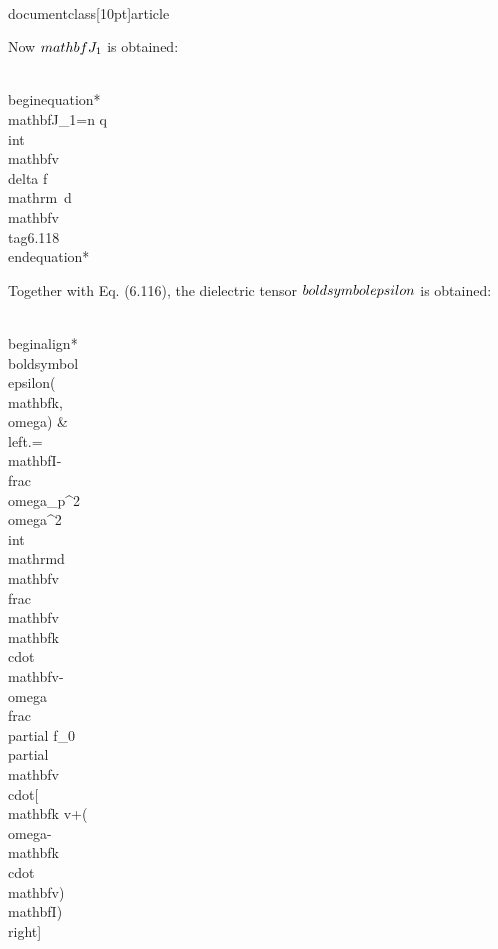 \\documentclass[10pt]{article}
\begin{document}
{{{{Now $\\mathbf{J}_{1}$ is obtained:


\\begin{equation*}
\\mathbf{J}_{1}=n q \\int \\mathbf{v} \\delta f \\mathrm{~d} \\mathbf{v} \\tag{6.118}
\\end{equation*}


Together with Eq. (6.116), the dielectric tensor $\\boldsymbol{\\epsilon}$ is obtained:


\\begin{align*}
\\boldsymbol{\\epsilon}(\\mathbf{k}, \\omega) & \\left.=\\mathbf{I}-\\frac{\\omega_{p}^{2}}{\\omega^{2}} \\int \\mathrm{d} \\mathbf{v} \\frac{\\mathbf{v}}{\\mathbf{k} \\cdot \\mathbf{v}-\\omega} \\frac{\\partial f_{0}}{\\partial \\mathbf{v}} \\cdot[\\mathbf{k v}+(\\omega-\\mathbf{k} \\cdot \\mathbf{v}) \\mathbf{I})\\right] \\\\
}}}}
\end{document}
